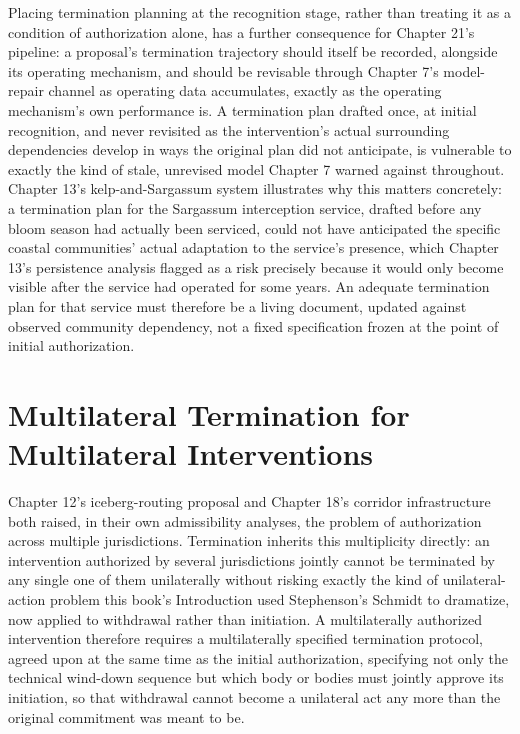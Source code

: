 \documentclass[11pt,oneside]{book}
\begin{document}
Placing termination planning at the recognition stage, rather than treating it as a condition of authorization alone, has a further consequence for Chapter 21's pipeline: a proposal's termination trajectory should itself be recorded, alongside its operating mechanism, and should be revisable through Chapter 7's model-repair channel as operating data accumulates, exactly as the operating mechanism's own performance is. A termination plan drafted once, at initial recognition, and never revisited as the intervention's actual surrounding dependencies develop in ways the original plan did not anticipate, is vulnerable to exactly the kind of stale, unrevised model Chapter 7 warned against throughout. Chapter 13's kelp-and-Sargassum system illustrates why this matters concretely: a termination plan for the Sargassum interception service, drafted before any bloom season had actually been serviced, could not have anticipated the specific coastal communities' actual adaptation to the service's presence, which Chapter 13's persistence analysis flagged as a risk precisely because it would only become visible after the service had operated for some years. An adequate termination plan for that service must therefore be a living document, updated against observed community dependency, not a fixed specification frozen at the point of initial authorization.

\section*{Multilateral Termination for Multilateral Interventions}

Chapter 12's iceberg-routing proposal and Chapter 18's corridor infrastructure both raised, in their own admissibility analyses, the problem of authorization across multiple jurisdictions. Termination inherits this multiplicity directly: an intervention authorized by several jurisdictions jointly cannot be terminated by any single one of them unilaterally without risking exactly the kind of unilateral-action problem this book's Introduction used Stephenson's Schmidt to dramatize, now applied to withdrawal rather than initiation. A multilaterally authorized intervention therefore requires a multilaterally specified termination protocol, agreed upon at the same time as the initial authorization, specifying not only the technical wind-down sequence but which body or bodies must jointly approve its initiation, so that withdrawal cannot become a unilateral act any more than the original commitment was meant to be.
\end{document}
